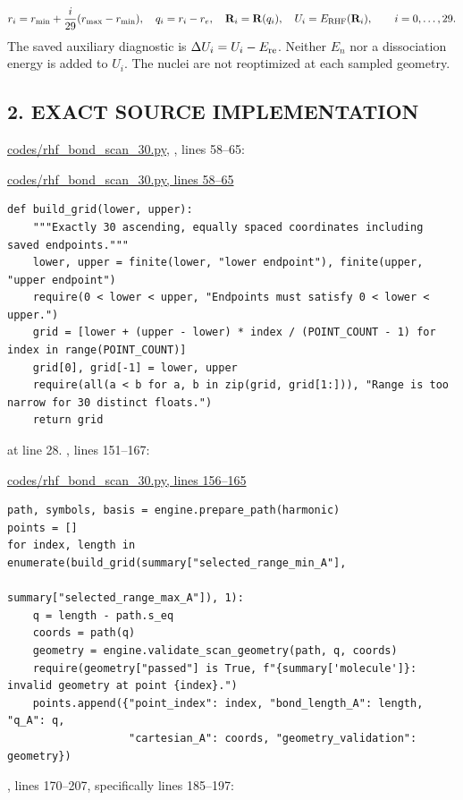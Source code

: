 \documentclass[10pt,a4paper]{article}
\begin{document}
\[
r_i=r_{\min}+\frac{i}{29}(r_{\max}-r_{\min}),\quad
q_i=r_i-r_e,\quad \mathbf R_i=\mathbf R(q_i),\quad
U_i=E_{\rm RHF}(\mathbf R_i),\qquad i=0,\ldots,29.
\]
The saved auxiliary diagnostic is \(\Delta U_i=U_i-E_{\rm re}\). Neither \(E_n\) nor a dissociation energy is added to \(U_i\). The nuclei are not reoptimized at each sampled geometry.

\subsection{2. EXACT SOURCE IMPLEMENTATION}
\href{/Users/novaz/Desktop/qml2.0/codes/rhf\_bond\_scan\_30.py:58}{codes/rhf\_bond\_scan\_30.py}, , lines 58–65:

\href{/Users/novaz/Desktop/qml2.0/codes/rhf\_bond\_scan\_30.py:58}{codes/rhf\_bond\_scan\_30.py, lines 58–65}

\begin{Verbatim}
def build_grid(lower, upper):
    """Exactly 30 ascending, equally spaced coordinates including saved endpoints."""
    lower, upper = finite(lower, "lower endpoint"), finite(upper, "upper endpoint")
    require(0 < lower < upper, "Endpoints must satisfy 0 < lower < upper.")
    grid = [lower + (upper - lower) * index / (POINT_COUNT - 1) for index in range(POINT_COUNT)]
    grid[0], grid[-1] = lower, upper
    require(all(a < b for a, b in zip(grid, grid[1:])), "Range is too narrow for 30 distinct floats.")
    return grid
\end{Verbatim}
 at line 28. , lines 151–167:

\href{/Users/novaz/Desktop/qml2.0/codes/rhf\_bond\_scan\_30.py:156}{codes/rhf\_bond\_scan\_30.py, lines 156–165}

\begin{Verbatim}
path, symbols, basis = engine.prepare_path(harmonic)
points = []
for index, length in enumerate(build_grid(summary["selected_range_min_A"],
                                           summary["selected_range_max_A"]), 1):
    q = length - path.s_eq
    coords = path(q)
    geometry = engine.validate_scan_geometry(path, q, coords)
    require(geometry["passed"] is True, f"{summary['molecule']}: invalid geometry at point {index}.")
    points.append({"point_index": index, "bond_length_A": length, "q_A": q,
                   "cartesian_A": coords, "geometry_validation": geometry})
\end{Verbatim}
, lines 170–207, specifically lines 185–197:
\end{document}
